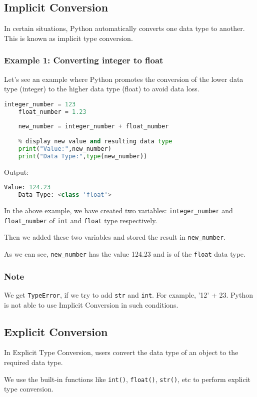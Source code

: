 \documentclass{article}
\begin{document}
\subsection{Implicit Conversion}
In certain situations, Python automatically converts one data type to another. This is known as implicit type conversion.

\subsubsection{Example 1: Converting integer to float}
Let's see an example where Python promotes the conversion of the lower data type (integer) to the higher data type (float) to avoid data loss.
\begin{lstlisting}[language=Python]
	integer_number = 123
	float_number = 1.23
	
	new_number = integer_number + float_number
	
	% display new value and resulting data type
	print("Value:",new_number)
	print("Data Type:",type(new_number))
\end{lstlisting}
Output:
\begin{lstlisting}[language=Python]
	Value: 124.23
	Data Type: <class 'float'>
\end{lstlisting}
In the above example, we have created two variables: \texttt{integer\_number} and \texttt{float\_number} of \texttt{int} and \texttt{float} type respectively.

Then we added these two variables and stored the result in \texttt{new\_number}.

As we can see, \texttt{new\_number} has the value 124.23 and is of the \texttt{float} data type.

\subsubsection{Note}
We get \texttt{TypeError}, if we try to add \texttt{str} and \texttt{int}. For example, '12' + 23. Python is not able to use Implicit Conversion in such conditions.

\subsection{Explicit Conversion}
In Explicit Type Conversion, users convert the data type of an object to the required data type.

We use the built-in functions like \texttt{int()}, \texttt{float()}, \texttt{str()}, etc to perform explicit type conversion.
\end{document}
